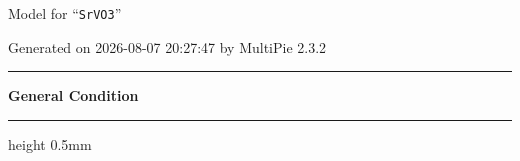 \documentclass[fleqn,10pt,landscape]{jsarticle}
\begin{document}
\setcounter{MaxMatrixCols}{32}

\renewcommand{\tablename}{Table~}
\renewcommand{\figurename}{Figure~}
\setlength{\baselineskip}{16pt}
\setlength{\parindent}{0pt}
\setlength{\mathindent}{0pt}
\footnotesize
\begin{center}
\LARGE
Model for ``\texttt{SrVO3}''
\end{center}
\begin{flushright}
Generated on 2026-08-07 20:27:47 by MultiPie 2.3.2
\end{flushright}
\setlength{\baselineskip}{16pt}
\footnotesize
\vspace{5mm}
\noindent \rule[0.5mm]{5mm}{0.5mm}\hspace{3mm}\textbf{General Condition}\hspace{3mm}\leaders\hrule height 0.5mm\hfill\kern0pt
\vspace{3mm}
\end{document}
